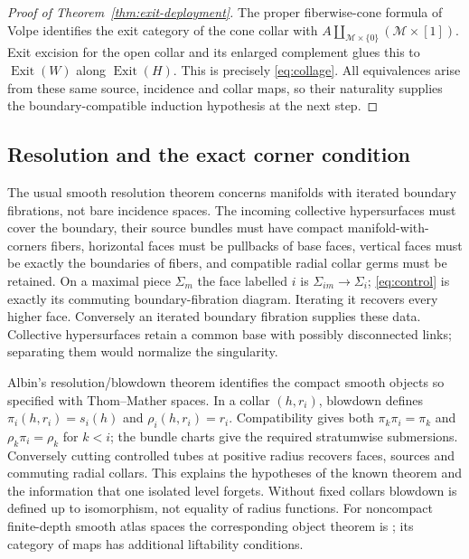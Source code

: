 \documentclass[11pt,a4paper]{article}
\theoremstyle{definition}
\begin{document}
\begin{proof}[Proof of Theorem~\ref{thm:exit-deployment}]
The proper fiberwise-cone formula of Volpe
\cite[Lemma~2.13]{Volpe} identifies the exit category of the cone
collar with $A\coprod_{\mathcal M\times\{0\}}(\mathcal M\times[1])$.
Exit excision for the open collar and its enlarged complement
\cite[Corollary~2.17]{Volpe} glues this to $\operatorname{Exit}(W)$
along $\operatorname{Exit}(H)$. This is precisely
\eqref{eq:collage}. All equivalences arise from these same source,
incidence and collar maps, so their naturality supplies the
boundary-compatible induction hypothesis at the next step.
\end{proof}

\subsection{Resolution and the exact corner condition}
The usual smooth resolution theorem concerns manifolds with iterated
boundary fibrations, not bare incidence spaces. The incoming collective
hypersurfaces must cover the boundary, their source bundles must have
compact manifold-with-corners fibers, horizontal faces must be pullbacks
of base faces, vertical faces must be exactly the boundaries of fibers,
and compatible radial collar germs must be retained. On a maximal
piece $\Sigma_m$ the face labelled $i$ is $\Sigma_{im}\to\Sigma_i$;
\eqref{eq:control} is exactly its commuting boundary-fibration diagram.
Iterating it recovers every higher face. Conversely an iterated boundary
fibration supplies these data. Collective hypersurfaces retain a common
base with possibly disconnected links; separating them would normalize
the singularity.

Albin's resolution/blowdown theorem \cite[Theorem~6.3, pp.~48--49]{Albin}
identifies the compact smooth objects so specified with Thom--Mather
spaces. In a collar $(h,r_i)$, blowdown defines
$\pi_i(h,r_i)=s_i(h)$ and $\rho_i(h,r_i)=r_i$.
Compatibility gives both $\pi_k\pi_i=\pi_k$ and
$\rho_k\pi_i=\rho_k$ for $k<i$; the bundle charts give the required
stratumwise submersions. Conversely cutting controlled tubes at positive
radius recovers faces, sources and commuting radial collars. This
explains the hypotheses of the known theorem and the information that
one isolated level forgets. Without fixed collars blowdown is defined
up to isomorphism, not equality of radius functions. For noncompact
finite-depth smooth atlas spaces the corresponding object theorem is
\cite[Theorems~2.10 and~2.13]{ABP}; its category of maps has additional
liftability conditions.
\end{document}
